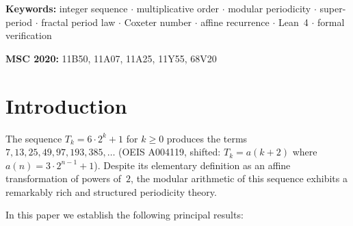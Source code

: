 \documentclass[11pt, a4paper]{article}
\theoremstyle{plain}
\theoremstyle{definition}
\theoremstyle{remark}
\begin{document}
\smallskip
\noindent\textbf{Keywords:} integer sequence $\cdot$ multiplicative
order $\cdot$ modular periodicity $\cdot$ super-period $\cdot$
fractal period law $\cdot$ Coxeter number $\cdot$
affine recurrence $\cdot$ Lean~4 $\cdot$ formal verification

\smallskip
\noindent\textbf{MSC 2020:} 11B50, 11A07, 11A25, 11Y55, 68V20

\vspace{0.5cm}

\section{Introduction}

The sequence $T_k = 6 \cdot 2^k + 1$ for $k \geq 0$ produces the terms
$7, 13, 25, 49, 97, 193, 385, \ldots$ (OEIS A004119, shifted:
$T_k = a(k{+}2)$ where $a(n) = 3 \cdot 2^{n-1} + 1$). Despite its
elementary definition as an affine transformation of powers of~$2$, the
modular arithmetic of this sequence exhibits a remarkably rich and
structured periodicity theory.

In this paper we establish the following principal results:
\end{document}
